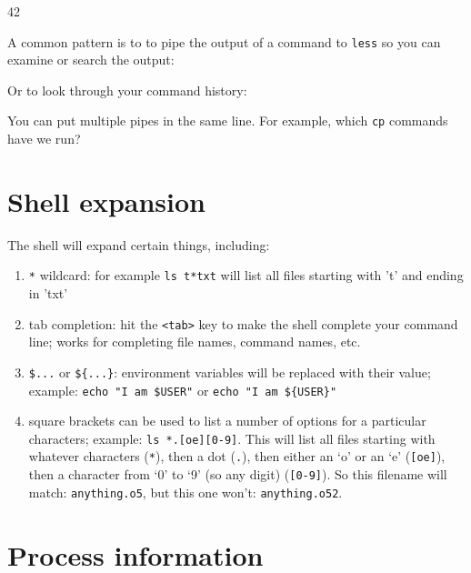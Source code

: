 \begin{prompt}
     42
\end{prompt}

A common pattern is to to pipe the output of a command to \verb|less| so you can
examine or search the output:

\begin{prompt}
\end{prompt}

Or to look through your command history:

\begin{prompt}
\end{prompt}

You can put multiple pipes in the same line. For example, which \verb|cp| commands have we run?

\begin{prompt}
\end{prompt}

\section{Shell expansion}

The shell will expand certain things, including:

\begin{enumerate}
\item \verb|*| wildcard: for example \verb|ls t*txt| will list all files starting with 't' and ending in 'txt'
\item tab completion: hit the \verb|<tab>| key to make the shell complete your command line; works for completing file names, command names, etc.
\item \verb|$...| or \verb|${...}|: environment variables will be replaced with their value;
example: \verb|echo "I am $USER"| or \verb|echo "I am ${USER}"|
\item square brackets can be used to list a number of options for a particular characters; example: \verb|ls *.[oe][0-9]|.
This will list all files starting with whatever characters (\verb|*|), then a dot (\verb|.|), then either
an `o' or an `e' (\verb|[oe]|), then a character from `0' to `9' (so any digit) (\verb|[0-9]|).
So this filename will match: \verb|anything.o5|, but this one won't: \verb|anything.o52|.

\end{enumerate}

\section{Process information}

